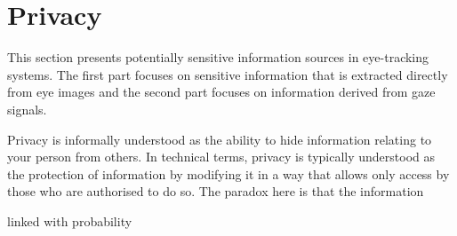 







\section{Privacy}
This section presents potentially sensitive information sources in eye-tracking systems. The first part focuses on sensitive information that is extracted directly from eye images and the second part focuses on information derived from gaze signals.


Privacy is informally understood as the ability to hide information relating to your person from others. In technical terms, privacy is typically understood as the protection of information by modifying it in a way that allows only access by those who are authorised to do so. The paradox here is that the information 

 linked with probability 

